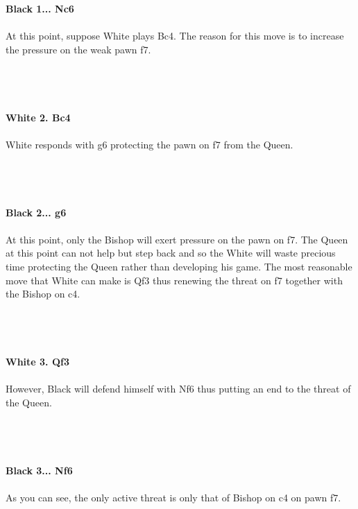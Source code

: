 \documentclass{article}
\begin{document}
\\

\\
\\
\textbf{Black 1... Nc6}\\
\\
At this point, suppose White plays Bc4. The reason for this move is to increase the pressure on the weak pawn f7.\\\\
\\

\\
\\
\textbf{White 2. Bc4}\\
\\
White responds with g6 protecting the pawn on f7 from the Queen.\\\\
\\

\\
\\
\textbf{Black 2... g6}\\
\\
At this point, only the Bishop will exert pressure on the pawn on f7. The Queen at this point can not help but step back and so the White will waste precious time protecting the Queen rather than developing his game. The most reasonable move that White can make is Qf3 thus renewing the threat on f7 together with the Bishop on c4.\\\\
\\

\\
\\
\textbf{White 3. Qf3}\\
\\
However, Black will defend himself with Nf6 thus putting an end to the threat of the Queen.\\\\
\\

\\
\\
\textbf{Black 3... Nf6}\\
\\
As you can see, the only active threat is only that of Bishop on c4 on pawn f7.\\\\
\end{document}
